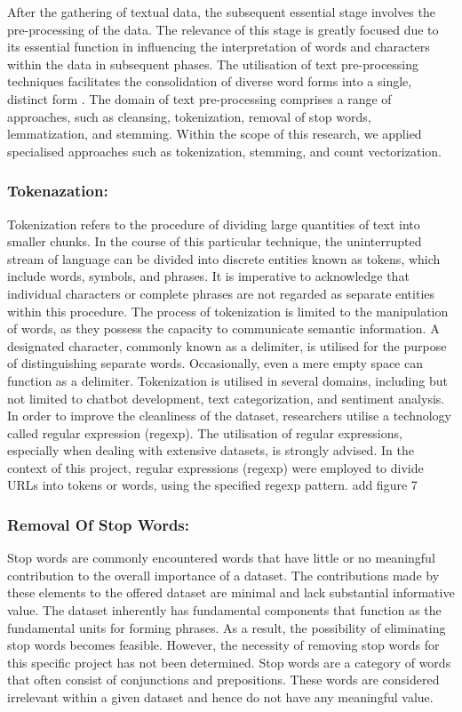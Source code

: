 After the gathering of textual data, the subsequent essential stage involves the pre-processing of the data. The relevance of this stage is greatly focused due to its essential function in influencing the interpretation of words and characters within the data in subsequent phases\cite{Srividhya}. The utilisation of text pre-processing techniques facilitates the consolidation of diverse word forms into a single, distinct form \cite{Srividhya}. The domain of text pre-processing comprises a range of approaches, such as cleansing, tokenization, removal of stop words, lemmatization, and stemming. Within the scope of this research, we applied specialised approaches such as tokenization, stemming, and count vectorization.
\subsubsection{Tokenazation:}


Tokenization refers to the procedure of dividing large quantities of text into smaller chunks. In the course of this particular technique, the uninterrupted stream of language can be divided into discrete entities known as tokens, which include words, symbols, and phrases\cite{hickman2022}. It is imperative to acknowledge that individual characters or complete phrases are not regarded as separate entities within this procedure. The process of tokenization is limited to the manipulation of words, as they possess the capacity to communicate semantic information. A designated character, commonly known as a delimiter, is utilised for the purpose of distinguishing separate words. Occasionally, even a mere empty space can function as a delimiter. Tokenization is utilised in several domains, including but not limited to chatbot development, text categorization, and sentiment analysis. In order to improve the cleanliness of the dataset, researchers utilise a technology called regular expression (regexp). The utilisation of regular expressions, especially when dealing with extensive datasets, is strongly advised. In the context of this project, regular expressions (regexp) were employed to divide URLs into tokens or words, using the specified regexp pattern.
add figure 7


\subsubsection{Removal Of Stop Words:}
Stop words are commonly encountered words that have little or no meaningful contribution to the overall importance of a dataset. The contributions made by these elements to the offered dataset are minimal and lack substantial informative value. The dataset inherently has fundamental components that function as the fundamental units for forming phrases\cite{Srividhya}. As a result, the possibility of eliminating stop words becomes feasible. However, the necessity of removing stop words for this specific project has not been determined. Stop words are a category of words that often consist of conjunctions and prepositions. These words are considered irrelevant within a given dataset and hence do not have any meaningful value.




